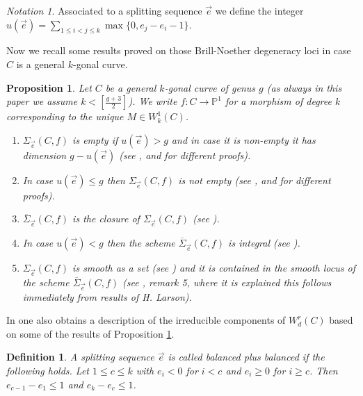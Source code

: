 \documentclass{article}
\newtheorem{proposition}{Proposition}
\newtheorem{definition}{Definition}
\theoremstyle{definition}
\theoremstyle{remark}
\newtheorem{notation}{Notation}
\begin{document}
\begin{notation}\label{notue}
Associated to a splitting sequence $\overrightarrow{e}$ we define the integer $u(\overrightarrow {e})=\sum _{1 \leq i <j \leq k} \max \{ 0,e_j-e_i-1 \}$.
\end{notation}

Now we recall some results proved on those Brill-Noether degeneracy loci in case $C$ is a general $k$-gonal curve.
\begin{proposition}\label{prop1.1}
Let $C$ be a general $k$-gonal curve of genus $g$ (as always in this paper we assume $k< [\frac{g+3}{2}]$).
We write $f : C \rightarrow \mathbb{P}^1$ for a morphism of degree $k$ corresponding to the unique $M \in W^1_k(C)$.
\begin{enumerate}
\item $\Sigma_{\overrightarrow{e}}(C,f)$ is empty if $u(\overrightarrow {e})>g$ and in case it is non-empty it has dimension $g-u(\overrightarrow {e})$ (see \cite{ref7}, \cite{CPJ} and \cite{FFR} for different proofs).
\item In case $u(\overrightarrow {e})\leq g$ then $\Sigma _{\overrightarrow {e}}(C,f)$ is not empty (see \cite{ref7}, \cite{CPJLLV} and \cite{FFR} for different proofs).
\item $\overline {\Sigma}_{\overrightarrow {e}}(C,f)$ is the closure of $\Sigma_{\overrightarrow {e}}(C,f)$ (see \cite{ref7}).
\item In case $u(\overrightarrow {e})<g$ then the scheme $\overline{\Sigma}_{\overrightarrow {e}}(C,f)$ is integral (see \cite{ref6}).
\item $\Sigma _{\overrightarrow {e}}(C,f)$ is smooth as a set (see \cite {ref7}) and it is contained in the smooth locus of the scheme $\overline {\Sigma}_{\overrightarrow {e}}(C,f)$ (see \cite {ref2}, remark 5, where it is explained this follows immediately from results of H. Larson).
\end{enumerate}
\end{proposition}

In \cite{ref7} one also obtains a description of the irreducible components of $W^r_d(C)$ based on some of the results of Proposition \ref{prop1.1}.
\begin{definition}\label{balplusbal}
A splitting sequence $\overrightarrow {e}$ is called balanced plus balanced if the following holds.
Let $1 \leq c \leq k$ with $e_i <0$ for $i<c$ and $e_i \geq 0$ for $i \geq c$.
Then $e_{c-1} - e_1 \leq 1$ and $e_k - e_c \leq 1$.
\end{definition}
\end{document}
